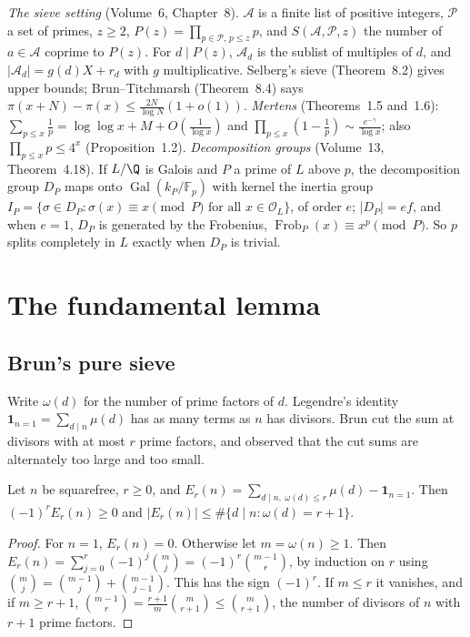 \begin{reminder}
\emph{The sieve setting} (Volume~6, Chapter~8). $\mathcal A$ is a finite list of positive integers, $\mathcal P$ a set of primes, $z\ge2$, $P(z)=\prod_{p\in\mathcal P,\,p\le z}p$, and $S(\mathcal A,\mathcal P,z)$ the number of $a\in\mathcal A$ coprime to $P(z)$. For $d\mid P(z)$, $\mathcal A_d$ is the sublist of multiples of $d$, and
$|\mathcal A_d|=g(d)X+r_d$ with $g$ multiplicative. Selberg's sieve (Theorem~8.2) gives upper bounds; Brun--Titchmarsh (Theorem~8.4) says $\pi(x+N)-\pi(x)\le\frac{2N}{\log N}(1+o(1))$. \emph{Mertens} (Theorems~1.5 and~1.6): $\sum_{p\le x}\frac1p=\log\log x+M+O(\frac1{\log x})$ and $\prod_{p\le x}(1-\frac1p)\sim\frac{e^{-\gamma}}{\log x}$; also $\prod_{p\le x}p\le4^x$ (Proposition~1.2).
\emph{Decomposition groups} (Volume~13, Theorem~4.18). If $L/\Q$ is Galois and $P$ a prime of $L$ above $p$, the decomposition group $D_P$ maps onto $\operatorname{Gal}(k_P/\mathbb F_p)$ with kernel the inertia group $I_P=\{\sigma\in D_P:\sigma(x)\equiv x\pmod P\text{ for all }x\in\mathcal O_L\}$, of order $e$; $|D_P|=ef$, and when $e=1$, $D_P$ is generated by the Frobenius, $\operatorname{Frob}_P(x)\equiv x^p\pmod P$. So $p$ splits completely in $L$ exactly when $D_P$ is trivial.
\end{reminder}

\section{The fundamental lemma}

\subsection*{Brun's pure sieve}

Write $\omega(d)$ for the number of prime factors of $d$. Legendre's identity $\mathbf 1_{n=1}=\sum_{d\mid n}\mu(d)$ has as many terms as $n$ has divisors. Brun cut the sum at divisors with at most $r$ prime factors, and observed that the cut sums are alternately too large and too small.

\begin{lemma}[Bonferroni]\label{lem:bonf}
Let $n$ be squarefree, $r\ge0$, and $E_r(n)=\sum_{d\mid n,\ \omega(d)\le r}\mu(d)-\mathbf 1_{n=1}$. Then $(-1)^rE_r(n)\ge0$ and $|E_r(n)|\le\#\{d\mid n:\omega(d)=r+1\}$.
\end{lemma}
\begin{proof}
For $n=1$, $E_r(n)=0$. Otherwise let $m=\omega(n)\ge1$. Then $E_r(n)=\sum_{j=0}^r(-1)^j\binom mj=(-1)^r\binom{m-1}r$, by induction on $r$ using $\binom mj=\binom{m-1}j+\binom{m-1}{j-1}$. This has the sign $(-1)^r$. If $m\le r$ it vanishes, and if $m\ge r+1$, $\binom{m-1}r=\frac{r+1}m\binom m{r+1}\le\binom m{r+1}$, the number of divisors of $n$ with $r+1$ prime factors.
\end{proof}


